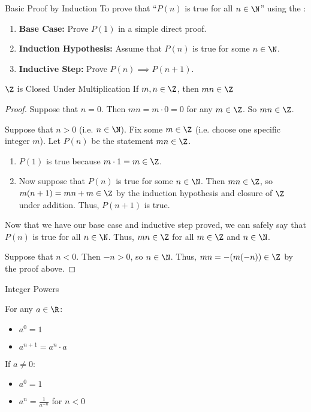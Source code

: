 \documentclass[letterpaper,12pt]{report}
\begin{document}
\begin{tecbox}{Basic Proof by Induction}{}
	To prove that ``$P(n)$ is true for all $n \in \N$'' using the :
	\begin{enumerate}
		\item \textbf{Base Case:} Prove $P(1)$ in a simple direct proof.
		\item \textbf{Induction Hypothesis:} Assume that $P(n)$ is true for some $n \in \N$.
		\item \textbf{Inductive Step:} Prove $P(n) \implies P(n+1)$.
	\end{enumerate}
\end{tecbox}

\begin{exbox}{$\Z$ is Closed Under Multiplication}{}
	If $m,n \in \Z$, then $mn \in \Z$
	\tcblower
	\begin{proof}
		Suppose that $n=0$. Then $mn = m \cdot 0 = 0$ for any $m \in \Z$. So $mn \in \Z$.

		Suppose that $n>0$ (i.e. $n \in \N$). Fix some $m \in \Z$ (i.e. choose one specific integer $m$). Let $P(n)$ be the statement $mn \in \Z$.
		\begin{enumerate}
			\item $P(1)$ is true because $m \cdot 1 = m \in \Z$.
			\item Now suppose that $P(n)$ is true for some $n \in \N$. Then $mn \in \Z$, so $m(n+1) = mn + m \in \Z$ by the induction hypothesis and closure of $\Z$ under addition. Thus, $P(n+1)$ is true.
		\end{enumerate}
		Now that we have our base case and inductive step proved, we can safely say that $P(n)$ is true for all $n \in \N$. Thus, $mn \in \Z$ for all $m \in \Z$ and $n \in \N$.

		Suppose that $n < 0$. Then $-n>0$, so $n \in \N$. Thus, $mn = -(m(-n)) \in \Z$ by the proof above.
	\end{proof}
\end{exbox}

\begin{dfnbox}{Integer Powers}{}
	\iffalse
	For any $a \in R$ and $n \in \Z$, the expression $a^n$ is called $a$ \dfntxt{to the power of} $n$.
	$$a^n = \begin{cases}
		1 & \text{if}\ n=0 \\
		a \cdot a^{n-1} & \text{if}\ n > 0 \\
		\frac{a^{n+1}}{a} & \text{if}\ n < 0
	\end{cases}$$
	\fi

	For any $a \in \R$:
	\begin{itemize}
		\item $a^0 = 1$
		\item $a^{n+1} = a^n \cdot a$
	\end{itemize}

	If $a \neq 0$:
	\begin{itemize}
		\item $a^0 = 1$
		\item $a^n = \frac{1}{a^{-n}}$ for $n < 0$
	\end{itemize}
\end{dfnbox}
\end{document}
